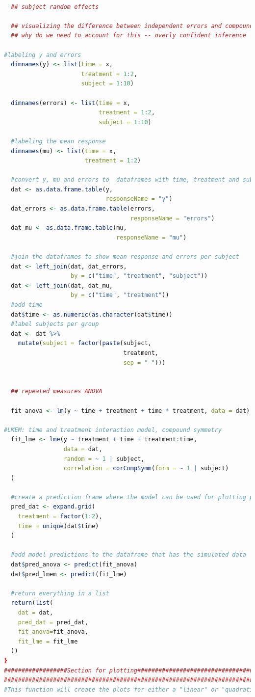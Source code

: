 \documentclass[
]{article}
\begin{document}
\begin{lstlisting}[language=R]
  
  ## subject random effects
  
  ## visualizing the difference between independent errors and compound symmetry
  ## why do we need to account for this -- overly confident inference
  
#labeling y and errors  
  dimnames(y) <- list(time = x, 
                      treatment = 1:2, 
                      subject = 1:10)

  dimnames(errors) <- list(time = x, 
                           treatment = 1:2, 
                           subject = 1:10)
  
  #labeling the mean response
  dimnames(mu) <- list(time = x, 
                       treatment = 1:2)
  
  #convert y, mu and errors to  dataframes with time, treatment and subject columns
  dat <- as.data.frame.table(y, 
                             responseName = "y")
  dat_errors <- as.data.frame.table(errors, 
                                    responseName = "errors")
  dat_mu <- as.data.frame.table(mu, 
                                responseName = "mu")
  
  #join the dataframes to show mean response and errors per subject
  dat <- left_join(dat, dat_errors, 
                   by = c("time", "treatment", "subject"))
  dat <- left_join(dat, dat_mu, 
                   by = c("time", "treatment"))
  #add time
  dat$time <- as.numeric(as.character(dat$time))
  #label subjects per group
  dat <- dat %>%
    mutate(subject = factor(paste(subject, 
                                  treatment, 
                                  sep = "-")))
  
  
  ## repeated measures ANOVA 
  
  fit_anova <- lm(y ~ time + treatment + time * treatment, data = dat)
  
#LMEM: time and treatment interaction model, compound symmetry 
  fit_lme <- lme(y ~ treatment + time + treatment:time,
                 data = dat,
                 random = ~ 1 | subject,
                 correlation = corCompSymm(form = ~ 1 | subject)
  )
  
  #create a prediction frame where the model can be used for plotting purposes
  pred_dat <- expand.grid(
    treatment = factor(1:2), 
    time = unique(dat$time)
  )
  
  #add model predictions to the dataframe that has the simulated data
  dat$pred_anova <- predict(fit_anova)
  dat$pred_lmem <- predict(fit_lme)

  #return everything in a list
  return(list(
    dat = dat,
    pred_dat = pred_dat,
    fit_anova=fit_anova,
    fit_lme = fit_lme
  ))
}
##################Section for plotting#################################
#######################################################################
#This function will create the plots for either a "linear" or "quadratic" response


\end{lstlisting}
\end{document}
